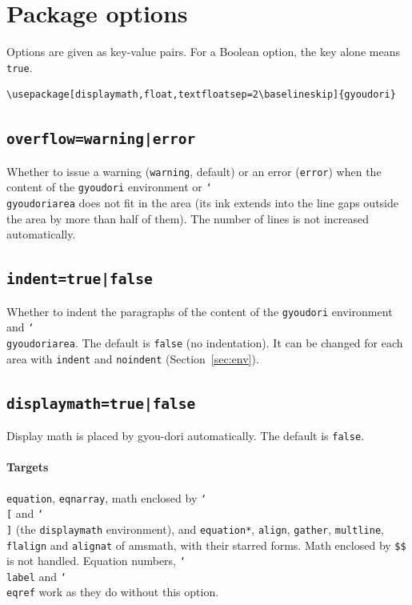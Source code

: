 \documentclass[paper=a4,dvipdfmx]{jlreq}
\newcommand\pkg[1]{\textsf{#1}}
\newcommand\opt[1]{\texttt{#1}}
\newcommand\env[1]{\texttt{#1}}
\newcommand\cs[1]{\texttt{\char`\\#1}}
\begin{document}
\section{Package options}

Options are given as key-value pairs. For a Boolean option, the key alone means
\opt{true}.
\begin{verbatim}
\usepackage[displaymath,float,textfloatsep=2\baselineskip]{gyoudori}
\end{verbatim}

\subsection{\opt{overflow=warning|error}}\label{sec:overflow}

Whether to issue a warning (\opt{warning}, default) or an error (\opt{error})
when the content of the \env{gyoudori} environment or \cs{gyoudoriarea} does not
fit in the area (its ink extends into the line gaps outside the area by more
than half of them). The number of lines is not increased automatically.

\subsection{\opt{indent=true|false}}\label{sec:indent}

Whether to indent the paragraphs of the content of the \env{gyoudori}
environment and \cs{gyoudoriarea}. The default is \opt{false} (no indentation).
It can be changed for each area with \opt{indent} and \opt{noindent}
(Section~\ref{sec:env}).

\subsection{\opt{displaymath=true|false}}\label{sec:displaymath}

Display math is placed by gyou-dori automatically. The default is \opt{false}.

\paragraph{Targets}
\env{equation}, \env{eqnarray}, math enclosed by \cs{[} and \cs{]}
(the \env{displaymath} environment), and \env{equation*}, \env{align},
\env{gather}, \env{multline}, \env{flalign} and \env{alignat} of \pkg{amsmath},
with their starred forms. Math enclosed by \verb|$$| is not handled. Equation
numbers, \cs{label} and \cs{eqref} work as they do without this option.
\end{document}
